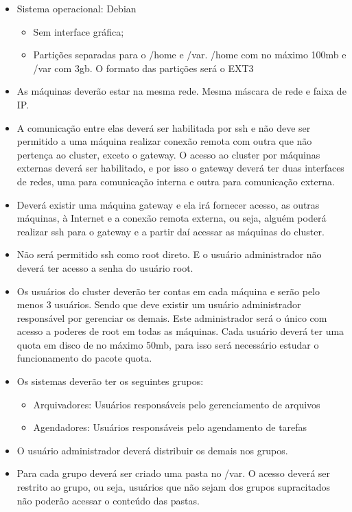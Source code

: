 \documentclass[
	12pt,				%
	openany,			%
	a4paper,			%
	chapter=TITLE,		%
	section=TITLE,		%
	english,
	brazil				%
]{abntex2}
\begin{document}
\begin{itemize}
	\item Sistema operacional: Debian
	\begin{itemize}
		\item Sem interface gráfica;
		\item Partições separadas para o /home e /var. /home com no máximo 100mb e /var com 3gb. O formato das partições será o EXT3
	\end{itemize}

	\item As máquinas deverão estar na mesma rede. Mesma máscara de rede e faixa de IP.

	\item A comunicação entre elas deverá ser habilitada por ssh e não deve ser permitido a uma máquina realizar conexão remota com outra que não pertença ao cluster, exceto o gateway. O acesso ao cluster por máquinas externas deverá ser habilitado, e por isso o gateway deverá ter duas interfaces de redes, uma para comunicação interna e outra para comunicação externa.

	\item Deverá existir uma máquina gateway e ela irá fornecer acesso, as outras máquinas, à Internet e a conexão remota externa, ou seja, alguém poderá realizar ssh para o gateway e a partir daí acessar as máquinas do cluster.

	\item Não será permitido ssh como root direto. E o usuário administrador não deverá ter acesso a senha do usuário root.

	\item Os usuários do cluster deverão ter contas em cada máquina e serão pelo menos 3 usuários. Sendo que deve existir um usuário administrador responsável por gerenciar os demais. Este administrador será o único com acesso a poderes de root em todas as máquinas. Cada usuário deverá ter uma quota em disco de no máximo 50mb, para isso será necessário estudar o funcionamento do pacote quota.

	\item Os sistemas deverão ter os seguintes grupos:
		\begin{itemize}
			\item Arquivadores: Usuários responsáveis pelo gerenciamento de arquivos
			\item Agendadores: Usuários responsáveis pelo agendamento de tarefas
		\end{itemize}		    	
    	
	\item O usuário administrador deverá distribuir os demais nos grupos.

	\item Para cada grupo deverá ser criado uma pasta no /var. O acesso deverá ser restrito ao grupo, ou seja, usuários que não sejam dos grupos supracitados não poderão acessar o conteúdo das pastas.

\end{itemize}
\end{document}
